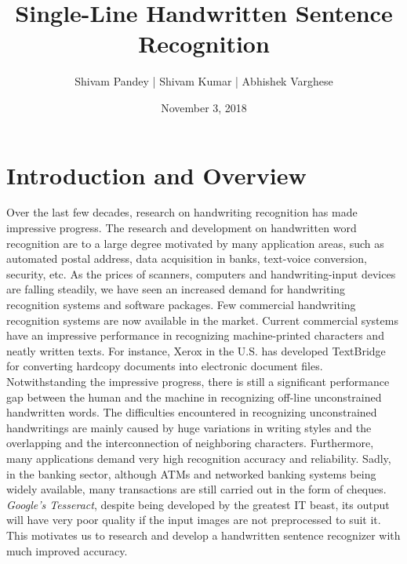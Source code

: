 \documentclass[a4paper, 12pt]{article}
\begin{document}
\title{Single-Line Handwritten Sentence Recognition}

\author{Shivam Pandey | Shivam Kumar | Abhishek Varghese} 
\date{November 3, 2018}

\maketitle


 
\section{Introduction and Overview}
Over the last few decades, research on handwriting recognition has made impressive progress. The research and development on handwritten word recognition are to a large degree motivated by many application areas, such as automated postal address, data acquisition in banks, text-voice conversion, security, etc. As the prices of scanners, computers and handwriting-input devices are falling steadily, we have seen an increased demand for handwriting recognition systems and software packages. Few commercial handwriting recognition systems are now available in the market. Current commercial systems have an impressive performance in recognizing machine-printed characters and neatly written texts. For instance, Xerox in the U.S. has developed TextBridge for converting hardcopy documents into electronic document files. Notwithstanding the impressive progress, there is still a significant performance gap between the human and the machine in recognizing off-line unconstrained handwritten words. The difficulties encountered in recognizing unconstrained handwritings are mainly caused by huge variations in writing styles and the overlapping and the interconnection of neighboring characters. Furthermore, many applications demand very high recognition accuracy and reliability. Sadly, in the banking sector, although ATMs and networked banking systems being widely available, many transactions are still carried out in the form of cheques. \emph{Google's Tesseract}, despite being developed by the greatest IT beast, its output will have very poor quality if the input images are not preprocessed to suit it. This motivates us to research and develop a handwritten sentence recognizer with much improved accuracy. 
\end{document}
